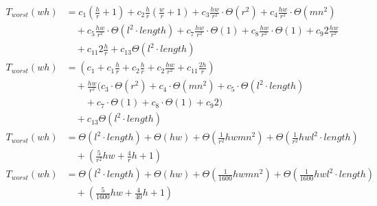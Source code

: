 \begin{subequations}
\label{eq:linedetection-hirzer-merging}
\begin{align}
\label{eq:linedetection-hirzer-merging-1}
T_{worst}(wh)& =
c_{1}(\frac{h}{r} + 1)
+c_{2}\frac{h}{r}(\frac{w}{r} + 1)
+c_{3}\frac{hw}{r^2}\cdot\Theta(r^2)
+c_{4}\frac{hw}{r^2}\cdot\Theta(mn^2)
\\
& \quad
+c_{5}\frac{hw}{r^2}\cdot\Theta(l^2\cdot\mathit{length})
+c_{7}\frac{hw}{r^2}\cdot\Theta(1)
+c_{8}\frac{hw}{r^2}\cdot\Theta(1)
+c_{9}2\frac{hw}{r^2}
\nonumber \\
& \quad
+c_{11}2\frac{h}{r}
+c_{13}\Theta(l^2\cdot\mathit{length})
\nonumber \\
\label{eq:linedetection-hirzer-merging-2}
T_{worst}(wh)& =
(c_{1} + c_{1}\frac{h}{r} + c_{2}\frac{h}{r} + c_{2}\frac{hw}{r^2} +c_{11}\frac{2h}{r})
\\
& \quad
+ \frac{hw}{r^2}\bigl(c_{3}\cdot\Theta(r^2) + c_{4}\cdot\Theta(mn^2) + c_{5}\cdot\Theta(l^2\cdot\mathit{length})
\nonumber \\
& \quad \quad
+ c_{7}\cdot\Theta(1) + c_{8}\cdot\Theta(1) +c_{9}2\bigr)
\nonumber \\
& \quad
+c_{13}\Theta(l^2\cdot\mathit{length})
\nonumber \\
\label{eq:linedetection-hirzer-merging-3}
T_{worst}(wh)& =
\Theta(l^2\cdot\mathit{length}) + \Theta(hw) + \Theta(\frac{1}{r^2}hwmn^2) +
 \Theta(\frac{1}{r^2}hwl^2\cdot\mathit{length})
\\
& \quad
+ (\frac{5}{r^2}hw + \frac{4}{r}h +1)
\nonumber \\
\label{eq:linedetection-hirzer-merging-4}
T_{worst}(wh)& =
\Theta(l^2\cdot\mathit{length}) + \Theta(hw) + \Theta(\frac{1}{1600}hwmn^2) +
 \Theta(\frac{1}{1600}hwl^2\cdot\mathit{length})
\\
& \quad
+ (\frac{5}{1600}hw + \frac{4}{40}h + 1)
\nonumber
\end{align}
\end{subequations}
